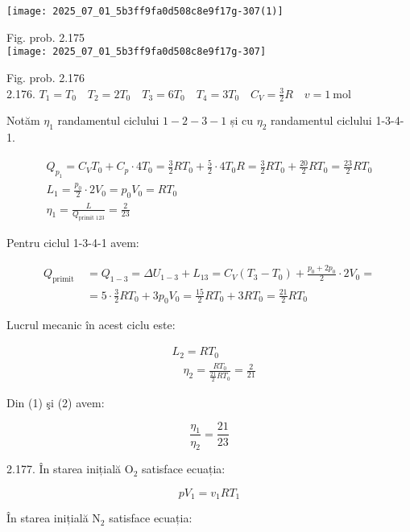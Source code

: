 \begin{center}
\texttt{[image: 2025\_07\_01\_5b3ff9fa0d508c8e9f17g-307(1)]}
\end{center}

Fig. prob. 2.175\\
\texttt{[image: 2025\_07\_01\_5b3ff9fa0d508c8e9f17g-307]}

Fig. prob. 2.176\\
2.176. $T_{1}=T_{0} \quad T_{2}=2 T_{0} \quad T_{3}=6 T_{0} \quad T_{4}=3 T_{0} \quad C_{V}=\frac{3}{2} R \quad v=1 \mathrm{~mol}$

Notăm $\eta_{1}$ randamentul ciclului $1-2-3-1$ și cu $\eta_{2}$ randamentul ciclului 1-3-4-1.


\begin{gather*}
Q_{p_{1}}=C_{V} T_{0}+C_{p} \cdot 4 T_{0}=\frac{3}{2} R T_{0}+\frac{5}{2} \cdot 4 T_{0} R=\frac{3}{2} R T_{0}+\frac{20}{2} R T_{0}=\frac{23}{2} R T_{0} \\
L_{1}=\frac{p_{0}}{2} \cdot 2 V_{0}=p_{0} V_{0}=R T_{0} \\
\eta_{1}=\frac{L}{Q_{\text {primit } 123}}=\frac{2}{23} \tag{1}
\end{gather*}


Pentru ciclul 1-3-4-1 avem:

$$
\begin{aligned}
Q_{\text {primit }} & =Q_{1-3}=\Delta U_{1-3}+L_{13}=C_{V}\left(T_{3}-T_{0}\right)+\frac{p_{0}+2 p_{0}}{2} \cdot 2 V_{0}= \\
& =5 \cdot \frac{3}{2} R T_{0}+3 p_{0} V_{0}=\frac{15}{2} R T_{0}+3 R T_{0}=\frac{21}{2} R T_{0}
\end{aligned}
$$

Lucrul mecanic în acest ciclu este:


\begin{align*}
& L_{2}=R T_{0} \\
& \quad \eta_{2}=\frac{R T_{0}}{\frac{21}{2} R T_{0}}=\frac{2}{21} \tag{2}
\end{align*}


Din (1) şi (2) avem:

$$
\frac{\eta_{1}}{\eta_{2}}=\frac{21}{23}
$$

2.177. În starea inițială $\mathrm{O}_{2}$ satisface ecuația:


\begin{equation*}
p V_{1}=v_{1} R T_{1} \tag{1}
\end{equation*}


În starea inițială $\mathrm{N}_{2}$ satisface ecuația:


